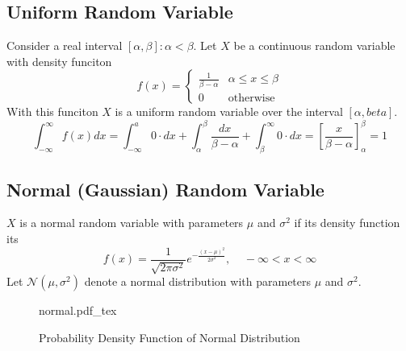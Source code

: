 \documentclass{article}
\newcommand{\incfig}[1]{%
    \def\svgwidth{\columnwidth}
    {#1.pdf_tex}
}
\theoremstyle{definition}
\begin{document}
    \subsection{Uniform Random Variable}
        Consider a real interval $[\alpha, \beta] : \alpha < \beta$. Let $X$ be a continuous random variable with density funciton 
        \[
            f(x) =
            \begin{cases}
                \frac{1}{\beta - \alpha} & \alpha \leq x \leq \beta\\
                0 & \text{otherwise}
            \end{cases}
        \]
        With this funciton $X$ is a uniform random variable over the interval $[\alpha, beta]$.
        \[
            \int_{-\infty}^\infty f(x) dx = \int_{-\infty} ^ a 0 \cdot dx + \int_\alpha^\beta \frac{dx}{\beta - \alpha} + \int_\beta^\infty 0 \cdot dx = \left[\frac{x}{\beta - \alpha}\right]_\alpha^\beta = 1
        \]
    \subsection{Normal (Gaussian) Random Variable}
    $X$ is a normal random variable with parameters $\mu$ and $\sigma^2$ if its density function its
    \[
        f(x) = \frac{1}{\sqrt{2\pi \sigma^2}} e^{-\frac{(x-\mu)^2}{2\sigma^2}}, \ \ \ \ \ -\infty < x < \infty
    \]
    Let $\mathcal{N}(\mu, \sigma^2)$ denote a normal distribution with parameters $\mu$ and $\sigma^2$.
    \begin{figure}[ht]
        \centering
        \incfig{normal}
        \caption{Probability Density Function of Normal Distribution}
        \label{fig:normal}
    \end{figure}
\end{document}
